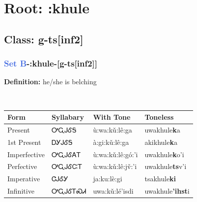 \needspace{4in}
\section*{Root: :khule}
\nopagebreak
{}
\needspace{3in}
\subsection*{Class: g-ts[inf2]}
\nopagebreak
\needspace{2in}
\subsubsection*{\textcolor{RoyalBlue}{Set B}{-}\textbf{:khule}{-}[g-ts[inf2]]}
\nopagebreak
\textbf{Definition: } he/she is belching
\\[0.5em]
\begin{tabularx}{\textwidth}{l X X X}%
\toprule%
\textbf{Form}&\textbf{Syllabary}&\textbf{With Tone}&\textbf{Toneless}\\%
\midrule%
Present&ᎤᏩᎫᎴᎦ&ù:wa:kǔ:lê:ga&uwakhule\textbf{k}a\\%
1st Present&ᎠᎩᎫᎴᎦ&à:gi:kǔ:lê:ga&akikhule\textbf{k}a\\%
Imperfective&ᎤᏩᎫᎴᎪᎢ&ù:wa:kǔ:lê:gó:’i&uwakhule\textbf{k}o'i\\%
Perfective&ᎤᏩᎫᎴᏨᎢ&ù:wa:kǔ:lê:jv̌:’i&uwakhule\textbf{ts}v'i\\%
Imperative&ᏣᎫᎴᎩ&ja:ku:lè:gi&tsakhule\textbf{ki}\\%
Infinitive&ᎤᏩᎫᎴᎢᏍᏗ&uwa:kǔ:lé’isdi&uwakhule\textbf{'ihst}i\\%
\bottomrule%
\end{tabularx}
\\[1em]
